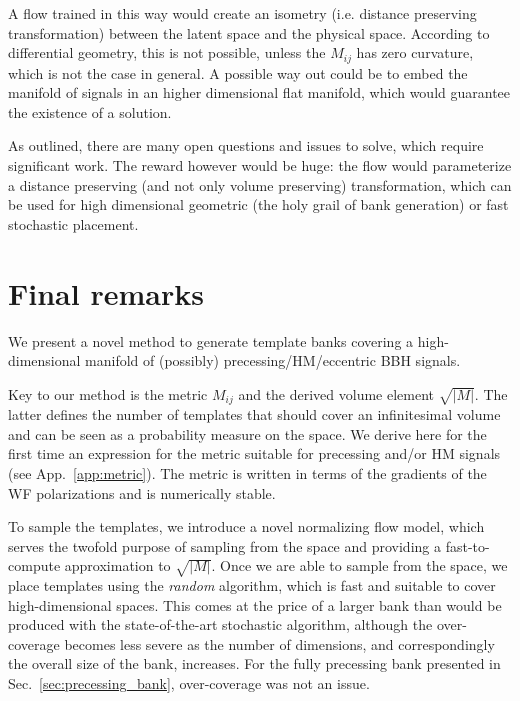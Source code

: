 \documentclass[twocolumn,showpacs,preprintnumbers,nofootinbib,prd,
superscriptaddress,10pt]{revtex4-2}
\begin{document}
A flow trained in this way would create an isometry (i.e. distance preserving transformation) between the latent space and the physical space. According to differential geometry, this is not possible, unless the $M_{ij}$ has zero curvature, which is not the case in general. A possible way out could be to embed the manifold of signals in an higher dimensional flat manifold, which would guarantee the existence of a solution.

As outlined, there are many open questions and issues to solve, which require significant work. The reward however would be huge: the flow would parameterize a distance preserving (and not only volume preserving) transformation, which can be used for high dimensional geometric (the holy grail of bank generation) or fast stochastic placement.

\section{Final remarks} \label{sec:conclusion}

We present a novel method to generate template banks covering a high-dimensional manifold of (possibly) precessing/HM/eccentric BBH signals.

Key to our method is the metric $M_{ij}$ and the derived volume element $\sqrt{|M|}$. The latter defines the number of templates that should cover an infinitesimal volume and can be seen as a probability measure on the space.
We derive here for the first time an expression for the metric suitable for precessing and/or HM signals (see App.~\ref{app:metric}). The metric is written in terms of the gradients of the WF polarizations and is numerically stable.

To sample the templates, we introduce a novel normalizing flow model, which serves the twofold purpose of sampling from the space and providing a fast-to-compute approximation to $\sqrt{|M|}$.
Once we are able to sample from the space, we place templates using the {\it random} algorithm, which is fast and suitable to cover high-dimensional spaces.
This comes at the price of a larger bank than would be produced with the state-of-the-art stochastic algorithm, although the over-coverage becomes less severe as the number of dimensions, and correspondingly the overall size of the bank, increases. For the fully precessing bank presented in Sec.~\ref{sec:precessing_bank}, over-coverage was not an issue.
\end{document}

